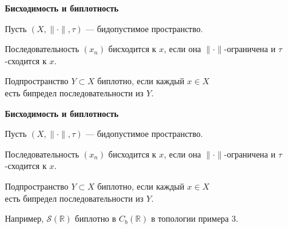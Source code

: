 \documentclass[11pt]{article}
\newcommand{\R}{\mathbb{R}}
\begin{document}
\begin{center}
{\color{notaeYELLOW}\bfseries\fontsize{44}{52}\selectfont Бисходимость и биплотность}
\end{center}
\vspace*{\fill}
\begin{center}
\fontsize{36}{43}\selectfont
\parbox{\linewidth}{\centering\noindent Пусть $(X,\|\cdot\|,\tau)$ --- бидопустимое пространство.
\par}\vspace{0.4in}
\parbox{\linewidth}{\centering\noindent Последовательность $(x_n)$ бисходится к $x$, если она $\|\cdot\|$-ограничена и $\tau$-сходится к $x$.
\par}\vspace{0.4in}
\parbox{\linewidth}{\centering\noindent Подпространство $Y\subset X$ биплотно, если каждый $x\in X$\\ есть бипредел последовательности из $Y$.
\par}\vspace{0.4in}
\end{center}
\vspace*{\fill}

\newpage

\begin{center}
{\color{notaeYELLOW}\bfseries\fontsize{44}{52}\selectfont Бисходимость и биплотность}
\end{center}
\vspace*{\fill}
\begin{center}
\fontsize{36}{43}\selectfont
\parbox{\linewidth}{\centering\noindent Пусть $(X,\|\cdot\|,\tau)$ --- бидопустимое пространство.
\par}\vspace{0.4in}
\parbox{\linewidth}{\centering\noindent Последовательность $(x_n)$ бисходится к $x$, если она $\|\cdot\|$-ограничена и $\tau$-сходится к $x$.
\par}\vspace{0.4in}
\parbox{\linewidth}{\centering\noindent Подпространство $Y\subset X$ биплотно, если каждый $x\in X$\\ есть бипредел последовательности из $Y$.
\par}\vspace{0.4in}
\parbox{\linewidth}{\centering\noindent Например, $\mathcal{S}(\R)$ биплотно в $C_b(\R)$ в топологии примера 3.
\par}\vspace{0.4in}
\end{center}
\vspace*{\fill}
\end{document}
